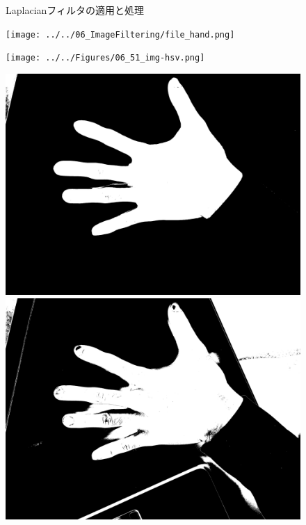\begin{figure}[H]
\begin{minipage}[b]{.3\textwidth}
        \label{fig:Laplacianフィルタのヒストグラム}
    \end{minipage}
    \caption{Laplacianフィルタの適用と処理}
\end{figure}
\begin{figure}[H]
    \centering
    \begin{minipage}[b]{.23\textwidth}
        \centering
        \texttt{[image: ../../06\_ImageFiltering/file\_hand.png]}
    \end{minipage}
    \begin{minipage}[b]{.23\textwidth}
        \centering
        \texttt{[image: ../../Figures/06\_51\_img-hsv.png]}
    \end{minipage}
    \begin{minipage}[b]{.23\textwidth}
        \centering
        \includegraphics[keepaspectratio,width=\textwidth]{../../Figures/06_52_scd.png}
    \end{minipage}
    \begin{minipage}[b]{.23\textwidth}
        \includegraphics[keepaspectratio,width=\textwidth]{../../Figures/06_53_hand.png}

\end{minipage}
\end{figure}
